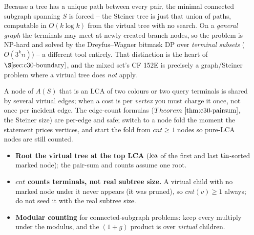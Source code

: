 \begin{insightbox}
Because a tree has a unique path between every pair, the minimal connected subgraph
spanning \(S\) is forced -- the Steiner tree is just that union of paths, computable in
\(O(k\log k)\) from the virtual tree with no search.  On a \emph{general graph} the
terminals may meet at newly-created branch nodes, so the problem is NP-hard and solved
by the Dreyfus--Wagner bitmask DP over \emph{terminal subsets} (\(O(3^k n)\)) -- a
different tool entirely.  That distinction is the heart of \(\secref{c30-boundary}\),
and the mixed set's CF 152E is precisely a graph/Steiner problem where a virtual tree
does \emph{not} apply.
\end{insightbox}

\begin{warningbox}
A node of \(A(S)\) that is an LCA of two colours or two query terminals is shared by
several virtual edges; when a cost is per \emph{vertex} you must charge it once, not once
per incident edge.  The edge-count formulas (\(\thmref{c30-pairsum}\), the Steiner size)
are per-edge and safe; switch to a node fold the moment the statement prices vertices,
and start the fold from \(\mathit{cnt}\ge1\) nodes so pure-LCA nodes are still counted.
\end{warningbox}

\begin{hardeningbox}
\begin{itemize}[nosep,leftmargin=1.4em]
  \item \textbf{Root the virtual tree at the top LCA} (\(\operatorname{lca}\) of the first and last
        \(\operatorname{tin}\)-sorted marked node); the pair-sum and counts assume one root.
  \item \textbf{\(\mathit{cnt}\) counts terminals, not real subtree size.} A virtual
        child with no marked node under it never appears (it was pruned), so
        \(\mathit{cnt}(v)\ge1\) always; do not seed it with the real subtree size.
  \item \textbf{Modular counting} for connected-subgraph problems: keep every multiply
        under the modulus, and the \((1+g)\) product is over \emph{virtual} children.
\end{itemize}
\end{hardeningbox}

